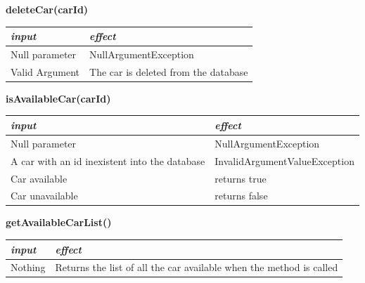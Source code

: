 \documentclass{article}
\begin{document}
\begin{flushleft}
  \begin{center}
   \begin {flushleft}
    \textbf{deleteCar(carId)}
    \end{flushleft}
        \begin{tabular}{  |  p{6cm} | p{6cm} |}
    \hline
    \textit{input} &  \textit{effect} \\
  
  \hline
   Null parameter & NullArgumentException \\
  \hline
  Valid Argument & The car is deleted from the database    \\
  \hline
    \end{tabular}
\end{center}

  \begin{center}
   \begin {flushleft}
    \textbf{isAvailableCar(carId)}
    \end{flushleft}
        \begin{tabular}{  |  p{6cm} | p{6cm} |}
    \hline
    \textit{input} &  \textit{effect} \\
    \hline
    
    Null parameter & NullArgumentException
     \\ 
  \hline
   A car with an id inexistent into the database & InvalidArgumentValueException  \\
  \hline
  Car available & returns true    \\
  \hline
  
  Car unavailable & returns false \\
  \hline
    \end{tabular}
\end{center}


  \begin{center}
   \begin {flushleft}
    \textbf{getAvailableCarList()}
    \end{flushleft}
        \begin{tabular}{  |  p{6cm} | p{6cm} |}
    \hline
    \textit{input} &  \textit{effect} \\
    \hline
    
    Nothing & Returns the list of all the car available when the method is called 
     \\ 

  \hline
    \end{tabular}
\end{center}


\end{flushleft}
\end{document}
